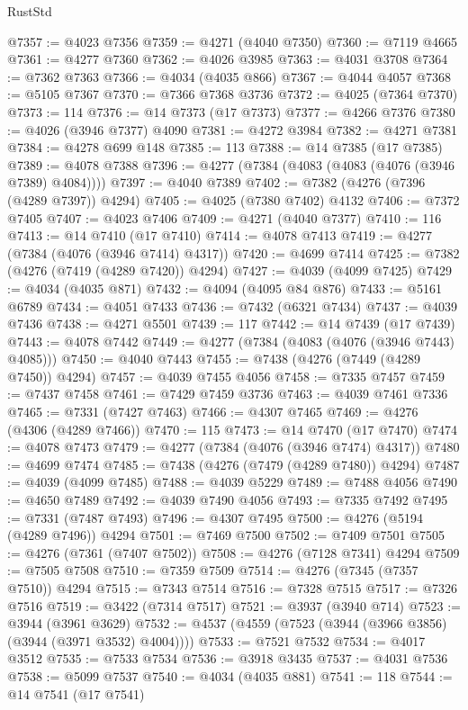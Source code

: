 \begin{lexlean}{RustStd}
\begin{coremodule}
@7357 := @4023 @7356
@7359 := @4271 (@4040 @7350)
@7360 := @7119 @4665
@7361 := @4277 @7360
@7362 := @4026 @3985
@7363 := @4031 @3708
@7364 := @7362 @7363
@7366 := @4034 (@4035 @866)
@7367 := @4044 @4057
@7368 := @5105 @7367
@7370 := @7366 @7368 @3736
@7372 := @4025 (@7364 @7370)
@7373 := 114
@7376 := @14 @7373 (@17 @7373)
@7377 := @4266 @7376
@7380 := @4026 (@3946 @7377) @4090
@7381 := @4272 @3984
@7382 := @4271 @7381
@7384 := @4278 @699 @148
@7385 := 113
@7388 := @14 @7385 (@17 @7385)
@7389 := @4078 @7388
@7396 := @4277 (@7384 (@4083 (@4083 (@4076 (@3946 @7389) @4084))))
@7397 := @4040 @7389
@7402 := @7382 (@4276 (@7396 (@4289 @7397)) @4294)
@7405 := @4025 (@7380 @7402) @4132
@7406 := @7372 @7405
@7407 := @4023 @7406
@7409 := @4271 (@4040 @7377)
@7410 := 116
@7413 := @14 @7410 (@17 @7410)
@7414 := @4078 @7413
@7419 := @4277 (@7384 (@4076 (@3946 @7414) @4317))
@7420 := @4699 @7414
@7425 := @7382 (@4276 (@7419 (@4289 @7420)) @4294)
@7427 := @4039 (@4099 @7425)
@7429 := @4034 (@4035 @871)
@7432 := @4094 (@4095 @84 @876)
@7433 := @5161 @6789
@7434 := @4051 @7433
@7436 := @7432 (@6321 @7434)
@7437 := @4039 @7436
@7438 := @4271 @5501
@7439 := 117
@7442 := @14 @7439 (@17 @7439)
@7443 := @4078 @7442
@7449 := @4277 (@7384 (@4083 (@4076 (@3946 @7443) @4085)))
@7450 := @4040 @7443
@7455 := @7438 (@4276 (@7449 (@4289 @7450)) @4294)
@7457 := @4039 @7455 @4056
@7458 := @7335 @7457
@7459 := @7437 @7458
@7461 := @7429 @7459 @3736
@7463 := @4039 @7461 @7336
@7465 := @7331 (@7427 @7463)
@7466 := @4307 @7465
@7469 := @4276 (@4306 (@4289 @7466))
@7470 := 115
@7473 := @14 @7470 (@17 @7470)
@7474 := @4078 @7473
@7479 := @4277 (@7384 (@4076 (@3946 @7474) @4317))
@7480 := @4699 @7474
@7485 := @7438 (@4276 (@7479 (@4289 @7480)) @4294)
@7487 := @4039 (@4099 @7485)
@7488 := @4039 @5229
@7489 := @7488 @4056
@7490 := @4650 @7489
@7492 := @4039 @7490 @4056
@7493 := @7335 @7492
@7495 := @7331 (@7487 @7493)
@7496 := @4307 @7495
@7500 := @4276 (@5194 (@4289 @7496)) @4294
@7501 := @7469 @7500
@7502 := @7409 @7501
@7505 := @4276 (@7361 (@7407 @7502))
@7508 := @4276 (@7128 @7341) @4294
@7509 := @7505 @7508
@7510 := @7359 @7509
@7514 := @4276 (@7345 (@7357 @7510)) @4294
@7515 := @7343 @7514
@7516 := @7328 @7515
@7517 := @7326 @7516
@7519 := @3422 (@7314 @7517)
@7521 := @3937 (@3940 @714)
@7523 := @3944 (@3961 @3629)
@7532 := @4537 (@4559 (@7523 (@3944 (@3966 @3856) (@3944 (@3971 @3532) @4004))))
@7533 := @7521 @7532
@7534 := @4017 @3512
@7535 := @7533 @7534
@7536 := @3918 @3435
@7537 := @4031 @7536
@7538 := @5099 @7537
@7540 := @4034 (@4035 @881)
@7541 := 118
@7544 := @14 @7541 (@17 @7541)

\end{coremodule}
\end{lexlean}
